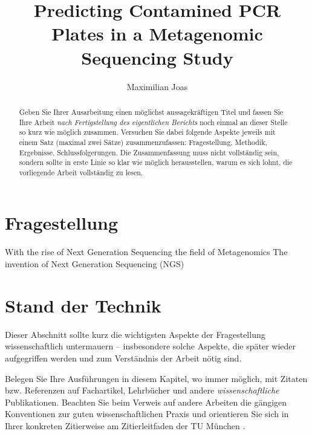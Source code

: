 \documentclass{svproc}
\begin{document}
\mainmatter              %
%
\title{Predicting Contamined PCR Plates in a Metagenomic Sequencing Study}
%
%
\author{Maximilian Joas }
%
%
%
%
\maketitle              %
%
\begin{abstract}
    Geben Sie Ihrer Ausarbeitung einen möglichst aussagekräftigen Titel und fassen Sie Ihre Arbeit \textit{nach Fertigstellung des eigentlichen Berichts} noch einmal an dieser Stelle so kurz wie möglich zusammen. Versuchen Sie dabei folgende Aspekte jeweils mit einem Satz (maximal zwei Sätze) zusammenzufassen: Fragestellung, Methodik, Ergeb\-nisse, Schlussfolgerungen. Die Zusammenfassung muss nicht voll\-ständig sein, sondern sollte in erste Linie so klar wie möglich herausstellen, warum es sich lohnt, die vorliegende Arbeit vollständig zu lesen.
\end{abstract}
%
%
\section{Fragestellung}
%
With the rise of Next Generation Sequencing the field of Metagenomics
The invention of Next Generation Sequencing (NGS) 
\section{Stand der Technik}

Dieser Abschnitt sollte kurz die wichtigsten Aspekte der Fragestellung wissenschaftlich untermauern -- insbesondere solche Aspekte, die später wieder aufgegriffen werden und zum Verständnis der Arbeit nötig sind. 

Belegen Sie Ihre Ausführungen in diesem Kapitel, wo immer möglich, mit Zitaten bzw. Referenzen auf Fachartikel, Lehrbücher und andere \textit{wissenschaftliche} Publikationen. Beachten Sie beim Verweis auf andere Arbeiten die gängigen Konventionen zur guten wissenschaftlichen Praxis \cite{DFG2019} und orientieren Sie sich in Ihrer konkreten Zitierweise am Zitierleitfaden der TU München \cite{TUM2019}.
\end{document}
